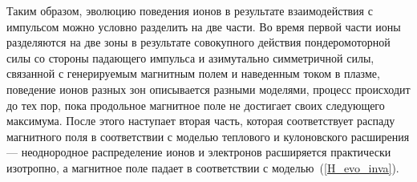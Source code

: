 Таким образом, эволюцию поведения ионов в результате взаимодействия с импульсом можно условно разделить на две части. Во время первой части ионы разделяются на две зоны в результате совокупного действия пондеромоторной силы со стороны падающего импульса и азимутально симметричной силы, связанной с генерируемым магнитным полем и наведенным током в плазме, поведение ионов разных зон описывается разными моделями, процесс происходит до тех пор, пока продольное магнитное поле не достигает своих следующего максимума. После этого наступает вторая часть, которая соответствует распаду магнитного поля в соответствии с моделью теплового и кулоновского расширения --- неоднородное распределение ионов и электронов расширяется практически изотропно, а магнитное поле падает в соответствии с моделью~(\ref{H_evo_inva}).



